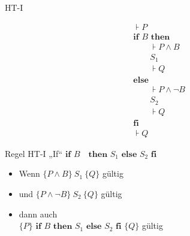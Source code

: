 \begin{frame}{HT-I}
	\begin{minipage}{0.4\linewidth}
		\begin{align*}
			&\assert{ P } \\
			& \textbf{if } B \textbf{ then} \\
			&\hspace{2em} \assert{ P \wedge B } \\
			&\hspace{2em} S_1 \\
			&\hspace{2em} \assert{ Q }\\
			&\textbf{else} \\
			&\hspace{2em} \assert{ P \wedge \neg B } \\
			&\hspace{2em} S_2 \\
			&\hspace{2em} \assert{ Q }  \\
			&\textbf{fi}\\
			&\assert{Q }
		\end{align*}
	\end{minipage}
	\begin{minipage}{0.55\linewidth}
		\begin{block}{Regel HT-I \quad „If“}
			$\textbf{if } B\text{ } \textbf{ then } S_1 \textbf{ else } S_2 \textbf{ fi}$
			\smallskip
			\begin{itemize}
				\item Wenn $\{ P \wedge B \}\ S_1\ \{ Q \}$ gültig 
				\item und $\{ P \wedge \neg B \}\ S_2\ \{ Q \}$ gültig
				\item dann auch \\ $\{ P \} \textbf{ if } B \textbf{ then } S_1 \textbf{ else } S_2 \textbf{ fi } \{ Q \} $ gültig
			\end{itemize}
		\end{block}
	\end{minipage}
\end{frame}

